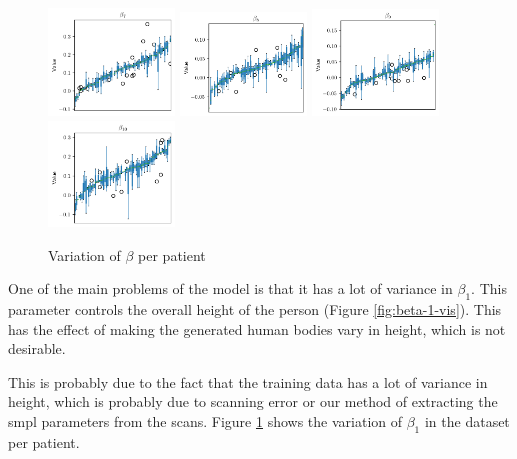 \begin{figure}[h]
    \includegraphics[width=0.3\textwidth]{files/beta_var/beta_7_var.png}
    \includegraphics[width=0.3\textwidth]{files/beta_var/beta_8_var.png}
    \includegraphics[width=0.3\textwidth]{files/beta_var/beta_9_var.png}
    \includegraphics[width=0.3\textwidth]{files/beta_var/beta_10_var.png}

    \caption{Variation of $\beta$ per patient}
    \label{fig:beta-var}
\end{figure}

One of the main problems of the model is that it has a lot of variance in
$\beta_1$. This parameter controls the overall height of the person (Figure
\ref{fig:beta-1-vis}). This has the effect of making the generated human bodies
vary in height, which is not desirable.

This is probably due to the fact that the training data has a lot of variance
in height, which is probably due to scanning error or our method of extracting
the \gls{smpl} parameters from the scans. Figure \ref{fig:beta-var} shows the
variation of $\beta_1$ in the dataset per patient.

